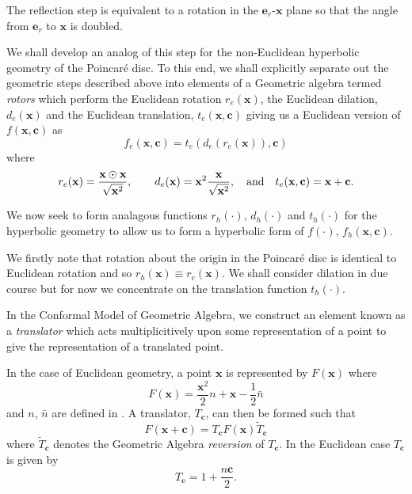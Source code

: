 \documentclass{elsart}
\theoremstyle{definition}
\newcommand{\complexprod}{\odot}
\begin{document}
The reflection step is equivalent to a rotation in the
$\mathbf{e}_r$-$\mathbf{x}$ plane so that the angle from $\mathbf{e}_r$ to
$\mathbf{x}$ is doubled.

We shall develop an analog of this step for the non-Euclidean hyperbolic
geometry of the Poincar\'e disc\cite{brannan}. 
To this end, we shall explicitly separate out
the geometric steps described above into elements of a Geometric algebra
termed \emph{rotors}\cite{wareham:amdo_rotor} which perform the
Euclidean rotation $r_e(\mathbf{x})$, the Euclidean dilation, $d_e(\mathbf{x})$
and the Euclidean translation,
$t_e(\mathbf{x}, \mathbf{c})$ giving us a Euclidean version of $f(\mathbf{x},
\mathbf{c})$ as
\begin{equation}
f_e(\mathbf{x}, \mathbf{c}) = t_e(d_e(r_e(\mathbf{x})), \mathbf{c})
\end{equation}
where
\begin{equation}
r_e(\mathbf{x}) = \frac{\mathbf{x}\complexprod\mathbf{x}}{\sqrt{\mathbf{x}^2}}, \qquad
d_e(\mathbf{x}) = \mathbf{x}^2 \frac{\mathbf{x}}{\sqrt{\mathbf{x}^2}}, 
\quad\hbox{and}\quad
t_e(\mathbf{x}, \mathbf{c}) = \mathbf{x} + \mathbf{c}.
\end{equation}

We now seek to form analagous functions $r_h(\cdot)$, $d_h(\cdot)$ and
$t_h(\cdot)$ for the hyperbolic geometry to allow us to form a
hyperbolic form of $f(\cdot)$, $f_h(\mathbf{x}, \mathbf{c})$.

We firstly note that rotation about the origin in the Poincar\'e disc is
identical to Euclidean rotation and so $r_h(\mathbf{x})
\equiv r_e(\mathbf{x})$. We shall consider dilation in due
course but for now we concentrate on the translation function $t_h(\cdot)$.

In the Conformal Model of Geometric Algebra\cite{WarehamThesis}, we construct
an element known as a \emph{translator} which acts multiplicitively upon
some representation of a point to give the representation of a translated
point.

In the case of Euclidean geometry, a point $\mathbf{x}$ is represented by
$F(\mathbf{x})$ where
\begin{equation}
F(\mathbf{x}) = \frac{\mathbf{x}^2}{2}n + \mathbf{x} - \frac{1}{2}\bar{n}
\end{equation}
and $n$, $\bar{n}$ are defined in \cite{WarehamThesis}. A translator,
$T_\mathbf{c}$, can then be formed such that
\begin{equation}
F(\mathbf{x} + \mathbf{c}) = T_\mathbf{c} F(\mathbf{x}) \tilde{T}_\mathbf{c}
\end{equation}
where $\tilde{T}_\mathbf{c}$ denotes the Geometric Algebra \emph{reversion} 
of $T_\mathbf{c}$. In the Euclidean case $T_\mathbf{c}$ is given
by
\begin{equation}
T_\mathbf{c} = 1 + \frac{n \mathbf{c}}{2}.
\end{equation}
\end{document}
